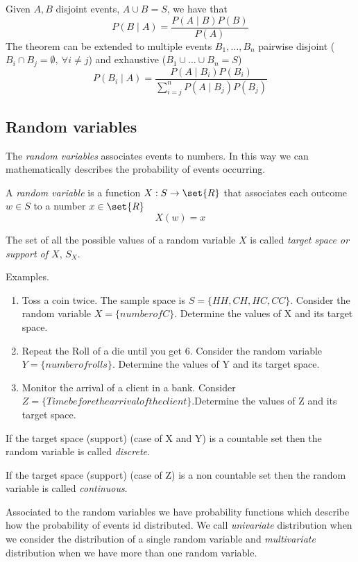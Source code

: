 \begin{theorem}
    Given $A, B$ disjoint events, $A \cup B = S$, we have that
    $$ P(B \mid A) = \frac{P(A \mid B)P(B)}{P(A)} $$
    The theorem can be extended to multiple events $B_1, \hdots, B_n$ pairwise disjoint ($B_i \cap B_j = \emptyset,\ \forall i \neq j$) and exhaustive ($B_1 \cup \hdots \cup B_n = S$)
    $$ P(B_i \mid A) = \frac{P(A \mid B_i)P(B_i)}{\sum_{i=j}^{n}{P(A \mid B_j)P(B_j)}} $$
\end{theorem}

\subsection{Random variables}
The \textit{random variables} associates events to numbers. In this way we can mathematically describes the probability
of events occurring.
\begin{definition}
    A \textit{random variable} is a function $X: S \rightarrow \set{R}$ that associates each outcome $w \in S$ to a number $x \in \set{R}$
    $$ X(w) = x $$
\end{definition}

\begin{definition}
    The set of all the possible values of a random variable $X$ is called \textit{target space or support of $X$}, $S_X$.
\end{definition}

Examples. 
\begin{enumerate}
\item Toss a coin twice. The sample space is $S=\{HH, CH, HC, CC\}$. Consider the random variable $X=\{number of C\}$. Determine the values of X and its target space.
\item Repeat the Roll of a die until you get 6. Consider the random variable $Y=\{ number of rolls \}$.
Determine the values of Y and its target space.
\item Monitor the arrival of a client in a bank. Consider $Z=\{ Time before the arrival of the client \}$.Determine the values of Z and its target space.

\end{enumerate}

If the target space (support) (case of X and Y) is a countable set then the random variable is called \textit{discrete}.

If the target space (support) (case of Z) is a non countable set then the random variable is called \textit{continuous}.

Associated to the random variables we have probability functions which describe how the probability of events id distributed. We call \textit{univariate} distribution when we consider the distribution of a single random variable and \textit{multivariate} distribution when we have more than one random variable.


